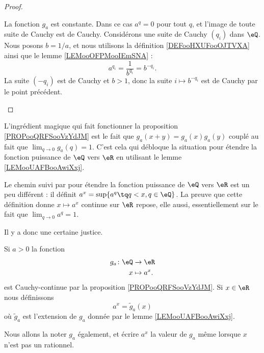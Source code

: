 \begin{proof}
\begin{subproof}
		\spitem[Pour \( a=1\)]
		La fonction \( g_a\) est constante.
		\spitem[Pour \( a=0\)]
		Dans ce cas \( a^q=0\) pour tout \( q\), et l'image de toute suite de Cauchy est de Cauchy.
		\spitem[Pour \( 0< a<1\)]
		Considérons une suite de Cauchy \( (q_i)\) dans \( \eQ\). Nous posons \( b=1/a\), et nous utilisons la définition \ref{DEFooHXUFooOJTVXA} ainsi que le lemme \ref{LEMooOFPMooIEmSNA} :
		\begin{equation}
			a^{q_i}=\frac{1}{ b^{q_i} }=b^{-q_i}.
		\end{equation}
		La suite \( (-q_i)\) est de Cauchy et \( b>1\), donc la suite \( i\mapsto b^{-q_i}\) est de Cauchy par le point précédent.
	\end{subproof}
\end{proof}

\begin{normaltext}
	L'ingrédient magique qui fait fonctionner la proposition \ref{PROPooQRFSooVzYdJM} est le fait que \( g_a(x+y)=g_a(x)g_a(y)\) couplé au fait que \( \lim_{q\to 0} g_a(q)=1\).
	C'est cela qui débloque la situation pour étendre la fonction puissance de \( \eQ\) vers \( \eR\) en utilisant le lemme \ref{LEMooUAFBooAwiXxj}.

	Le chemin suivi par \cite{BIBooXUZHooOHWxiF} pour étendre la fonction puissance de \( \eQ\) vers \( \eR\) est un peu différent : il définit \( a^x=\sup\{ a^q\tq q<x,q\in \eQ \}\). La preuve que cette définition donne \( x\mapsto a^x\) continue sur \( \eR\) repose, elle aussi, essentiellement sur le fait que \( \lim_{q\to 0} a^q=1\).

	Il y a donc une certaine justice.
\end{normaltext}

\begin{propositionDef}  \label{DEFooOJMKooJgcCtq}
	Si \( a>0\) la fonction
	\begin{equation}
		\begin{aligned}
			g_a\colon \eQ & \to \eR      \\
			x             & \mapsto a^x.
		\end{aligned}
	\end{equation}
	est Cauchy-continue par la proposition \ref{PROPooQRFSooVzYdJM}. Si \( x\in \eR\) nous définissons
	\begin{equation}
		a^x=\tilde g_a(x)
	\end{equation}
	où \( \tilde g_a\) est l'extension de \( g_a\) donnée par le lemme \ref{LEMooUAFBooAwiXxj}.

	Nous allons la noter \( g_a\) également, et écrire \( a^x\) la valeur de \( g_a\) même lorsque \( x\) n'est pas un rationnel.
\end{propositionDef}

